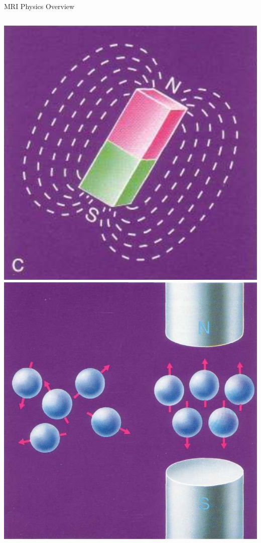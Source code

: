 \documentclass[aspectratio=169,xcolor=dvipsnames]{beamer}
\begin{document}

\begin{frame}{MRI Physics Overview}
\begin{columns}[c]
\includegraphics[width=1\textwidth]{imgs/magnet}
\includegraphics[width=1\textwidth]{imgs/extmagfield}

\end{columns}
\end{frame}
\end{document}

